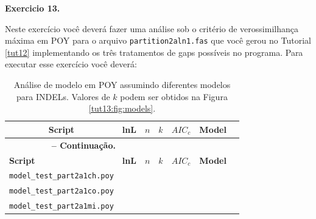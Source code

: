 \begin{refsection}
\begin{center}
\begin{table}[H]
\begin{tabular}{llllllll}
\end{tabular}
\end{table}

\end{center}

\normalsize
{}
\begin{blackBlock}{\textbf{Exercicio 13.}}\label{tut13:ex:13.4}

Neste exercício você deverá fazer uma análise sob o critério de verossimilhança máxima em POY para o arquivo \texttt{partition2aln1.fas} que você gerou no Tutorial \ref{tut12} implementando os três tratamentos de gaps possíveis no programa. Para executar esse exercício você deverá:

\end{blackBlock}



\pagestyle{fancy}
\begin{center}

\begin{longtable}{|l|>{\centering}m{2cm}|>{\centering}m{1cm}|c|>{\centering}m{2cm}|>{\centering}m{2cm} |@{}m{0pt}@{}}
\caption[Tratamento de gaps em POY.]{Análise de modelo em POY assumindo diferentes modelos para INDELs. Valores de $k$ podem ser obtidos na Figura \ref{tut13:fig:models}.} \label{tut13:ex:13.4} \\

\hline\hline  \multicolumn{1}{|c|}{\textbf{Script}} & \textbf{lnL}  & \textbf{$n$} & \textbf{$k$} & \textbf{$AIC_{c}$} & \textbf{Model} &\\
\endfirsthead

\multicolumn{3}{c}{{\bfseries \tablename\ \thetable{} -- Continuação.}}\\
\hline\hline \textbf{Script} & \textbf{lnL}  & \textbf{$n$} & \textbf{$k$} & \textbf{$AIC_{c}$} & \textbf{Model} &\\
\endhead
\hline \hline
\endlastfoot
\hline \scriptsize\texttt{model\_test\_part2a1ch.poy} & & & & & &\\
\hline \scriptsize\texttt{model\_test\_part2a1co.poy} & & & & & &\\
\hline \scriptsize\texttt{model\_test\_part2a1mi.poy} & & & & & &\\
\end{longtable}
\end{center}


\end{refsection}
